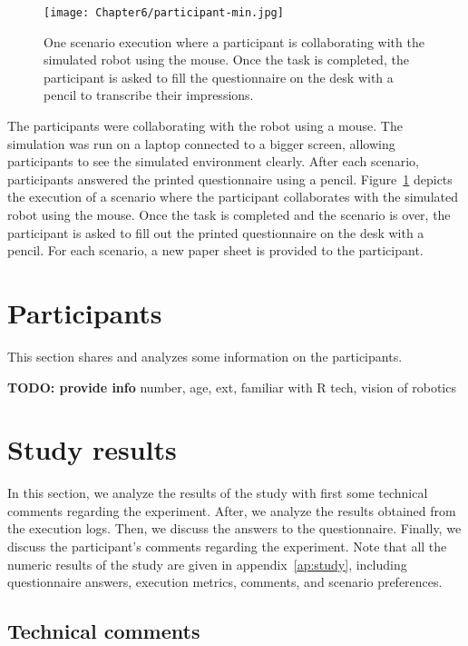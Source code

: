 \begin{figure}
    \center
    \texttt{[image: Chapter6/participant-min.jpg]}
    \caption{One scenario execution where a participant is collaborating with the simulated robot using the mouse. Once the task is completed, the participant is asked to fill the questionnaire on the desk with a pencil to transcribe their impressions.}
    \label{fig:participant}
\end{figure}

The participants were collaborating with the robot using a mouse. The simulation was run on a laptop connected to a bigger screen, allowing participants to see the simulated environment clearly. After each scenario, participants answered the printed questionnaire using a pencil. Figure~\ref{fig:participant} depicts the execution of a scenario where the participant collaborates with the simulated robot using the mouse. Once the task is completed and the scenario is over, the participant is asked to fill out the printed questionnaire on the desk with a pencil. For each scenario, a new paper sheet is provided to the participant. 

\section{Participants}

This section shares and analyzes some information on the participants.

\textbf{TODO: provide info} number, age, ext, familiar with R tech, vision of robotics

\section{Study results}

In this section, we analyze the results of the study with first some technical comments regarding the experiment. After, we analyze the results obtained from the execution logs. Then, we discuss the answers to the questionnaire. Finally, we discuss the participant's comments regarding the experiment. Note that all the numeric results of the study are given in appendix~\ref{ap:study}, including questionnaire answers, execution metrics, comments, and scenario preferences. 

\subsection{Technical comments}

